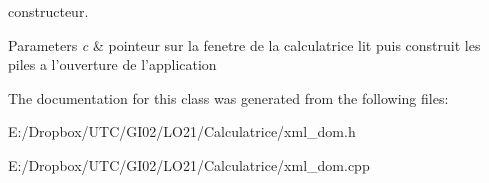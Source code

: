 constructeur. 


\begin{DoxyParams}{Parameters}
{\em c} & pointeur sur la fenetre de la calculatrice lit puis construit les piles a l'ouverture de l'application \\
\hline
\end{DoxyParams}


The documentation for this class was generated from the following files\-:\begin{DoxyCompactItemize}
\item 
E\-:/\-Dropbox/\-U\-T\-C/\-G\-I02/\-L\-O21/\-Calculatrice/xml\-\_\-dom.\-h\item 
E\-:/\-Dropbox/\-U\-T\-C/\-G\-I02/\-L\-O21/\-Calculatrice/xml\-\_\-dom.\-cpp\end{DoxyCompactItemize}
